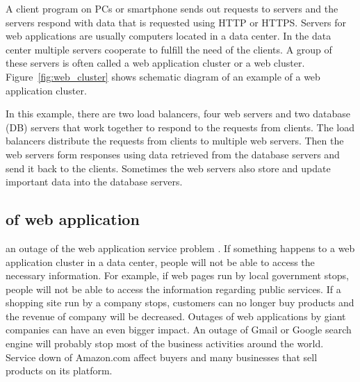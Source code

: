A client program on PCs or smartphone sends out requests to servers\added{,} and the servers respond with data that is requested using HTTP or HTTPS. 
Servers for web applications are usually computers located in a data center.
In the data center multiple servers cooperate to fulfill the need of the clients.
A group of these servers is often called a web application cluster or a web cluster.
Figure~\ref{fig:web_cluster} shows schematic diagram of an example of a web application cluster.

In this example, there are two load balancers, four web servers and two database (DB) servers that work together to respond to the requests from clients.
The load balancers distribute the requests from clients to multiple web servers.
Then the web servers form responses using data retrieved from the database servers and send it back to the clients.
Sometimes the web servers also store and update important data into the database servers.

\subsection{ of web application}


  an outage of the web application service  problem \cite{}.
If something happens to a web application cluster in a data center, people will not be able to access the necessary information.
%
For example, if web pages run by local government stops, people will not be able to access the information regarding public services.
If a shopping site run by a company stops, customers can no longer buy products and the revenue of  company will be  decreased.
Outages of web applications by giant companies can have an even bigger impact.
An outage of Gmail or Google search engine will probably stop most of the business activities around the world.
Service down of Amazon.com affect buyers and many businesses that sell products on its platform.

